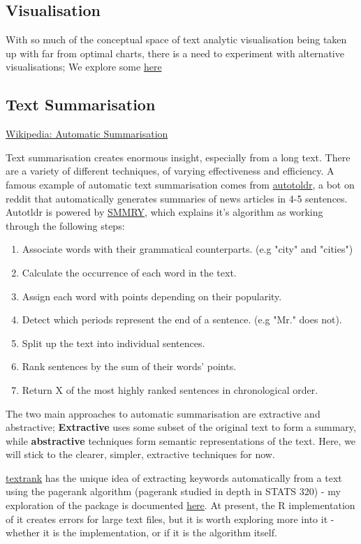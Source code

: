 \documentclass[a4paper, 11pt]{article}
\begin{document}
\subsection{Visualisation}
\label{sec:org579da2a}
With so much of the conceptual space of text analytic visualisation
being taken up with far from optimal charts, there is a need to
experiment with alternative visualisations; We explore some \href{sent-vis.org}{here}
\subsection{Text Summarisation}
\label{sec:orgff07799}
\href{https://en.wikipedia.org/wiki/Automatic\_summarization}{Wikipedia: Automatic Summarisation}

Text summarisation creates enormous insight, especially from a long
text. There are a variety of different techniques, of varying
effectiveness and efficiency. A famous example of automatic text
summarisation comes from \href{https://www.reddit.com/user/autotldr}{autotoldr}, a bot on reddit that automatically
generates summaries of news articles in 4-5 sentences. Autotldr is
powered by \href{https://smmry.com/about}{SMMRY}, which explains it's algorithm as working through the
following steps:

\begin{enumerate}
\item Associate words with their grammatical counterparts. (e.g "city"
and "cities")
\item Calculate the occurrence of each word in the text.
\item Assign each word with points depending on their popularity.
\item Detect which periods represent the end of a sentence. (e.g "Mr."
does not).
\item Split up the text into individual sentences.
\item Rank sentences by the sum of their words' points.
\item Return X of the most highly ranked sentences in chronological
order.
\end{enumerate}

The two main approaches to automatic summarisation are extractive and
abstractive; \textbf{Extractive} uses some subset of the original text to
form a summary, while \textbf{abstractive} techniques form semantic
representations of the text. Here, we will stick to the clearer,
simpler, extractive techniques for now.

\href{https://github.com/bnosac/textrank}{textrank} has the unique idea of extracting keywords automatically from
a text using the pagerank algorithm (pagerank studied in depth in
STATS 320) - my exploration of the package is documented \href{./textrank\_exploration.Rmd}{here}. At
present, the R implementation of it creates errors for large text
files, but it is worth exploring more into it - whether it is the
implementation, or if it is the algorithm itself.
\end{document}
